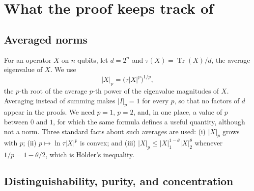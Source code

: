 \documentclass[aps,prl,twocolumn,superscriptaddress,floatfix]{revtex4-2}
\theoremstyle{plain}
\newcommand{\tr}{\operatorname{Tr}}
\newcommand{\nrm}[2]{\lvert #1\rvert_{#2}}
\begin{document}
\section{What the proof keeps track of}
\label{sm:norms}

\subsection{Averaged norms}

For an operator $X$ on $n$ qubits, let $d=2^n$ and $\tau(X)=\tr(X)/d$, the average eigenvalue of $X$. We use
\begin{equation}
\nrm Xp=\bigl(\tau|X|^p\bigr)^{1/p},
\label{eq:S-norm}
\end{equation}
the $p$-th root of the average $p$-th power of the eigenvalue magnitudes of $X$. Averaging instead of summing makes $\nrm Ip=1$ for every $p$, so that no factors of $d$ appear in the proofs. We need $p=1$, $p=2$, and, in one place, a value of $p$ between $0$ and $1$, for which the same formula defines a useful quantity, although not a norm. Three standard facts about such averages are used: (i) $\nrm Xp$ grows with $p$; (ii) $p\mapsto\ln\tau|X|^p$ is convex; and (iii) $\nrm Xp\le\nrm X1^{1-\theta}\nrm X2^{\theta}$ whenever $1/p=1-\theta/2$, which is H\"older's inequality.

\subsection{Distinguishability, purity, and concentration}
\end{document}
